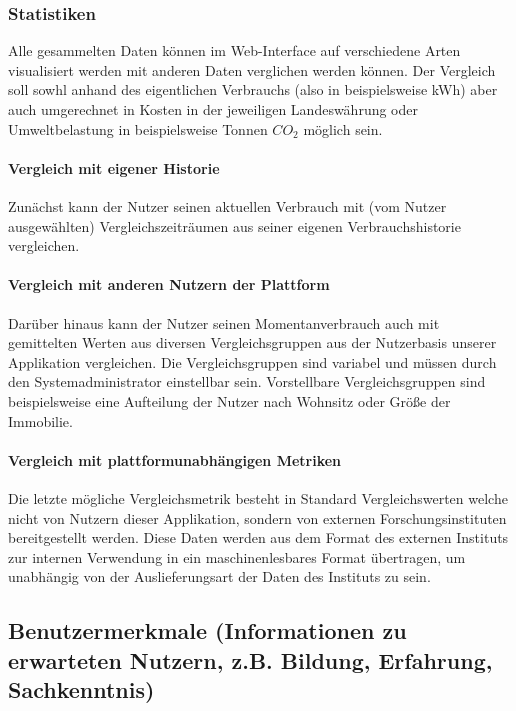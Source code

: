 \subsubsection{Statistiken}

Alle gesammelten Daten können im Web-Interface auf verschiedene Arten visualisiert werden mit anderen Daten verglichen werden können. Der Vergleich soll sowhl anhand des eigentlichen Verbrauchs (also in beispielsweise kWh) aber auch umgerechnet in Kosten in der jeweiligen Landeswährung oder Umweltbelastung in beispielsweise Tonnen $CO_2$ möglich sein.

\paragraph{Vergleich mit eigener Historie}

Zunächst kann der Nutzer seinen aktuellen Verbrauch  mit (vom Nutzer ausgewählten) Vergleichszeiträumen aus seiner eigenen Verbrauchshistorie vergleichen.


\paragraph{Vergleich mit anderen Nutzern der Plattform}
Darüber hinaus kann der Nutzer seinen Momentanverbrauch auch mit gemittelten Werten aus diversen Vergleichsgruppen aus der Nutzerbasis unserer Applikation vergleichen. Die Vergleichsgruppen sind variabel und müssen durch den Systemadministrator einstellbar sein. Vorstellbare Vergleichsgruppen sind beispielsweise eine Aufteilung der Nutzer nach Wohnsitz oder Größe der Immobilie.


\paragraph{Vergleich mit plattformunabhängigen Metriken}
\label{vgl_plattformunabhängig}

Die letzte mögliche Vergleichsmetrik besteht in Standard Vergleichswerten welche nicht von Nutzern dieser Applikation, sondern von externen Forschungsinstituten bereitgestellt werden. Diese Daten werden aus dem Format des externen Instituts zur internen Verwendung in ein maschinenlesbares Format übertragen, um unabhängig von der Auslieferungsart der Daten des Instituts zu sein.


\subsection{Benutzermerkmale (Informationen zu erwarteten Nutzern, z.B. Bildung, Erfahrung, Sachkenntnis)}\label{sec:desc_user}

